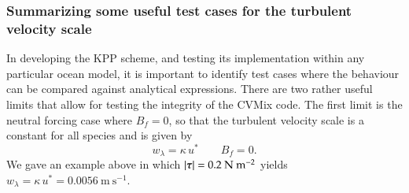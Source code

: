 \subsubsection{Summarizing some useful test cases for the turbulent velocity scale}

In developing the KPP scheme, and testing its implementation within
any particular ocean model, it is important to identify test cases
where the behaviour can be compared against analytical expressions.  
There are two rather useful limits that allow for testing the
integrity of the CVMix code.  The first limit is the neutral forcing
case where $B_{f} = 0$, so that the turbulent velocity scale is a
constant for all species and is given by
\begin{equation}
 w_{\lambda} = \kappa \, u^{*}  \qquad B_{f} = 0.
\end{equation}
We gave an example above in which $|\mbox{\boldmath $\tau$}| =
0.2~\mbox{N}~\mbox{m}^{-2}$ yields $w_{\lambda} = \kappa \, u^{*} =
0.0056~\mbox{m}~\mbox{s}^{-1}$.

